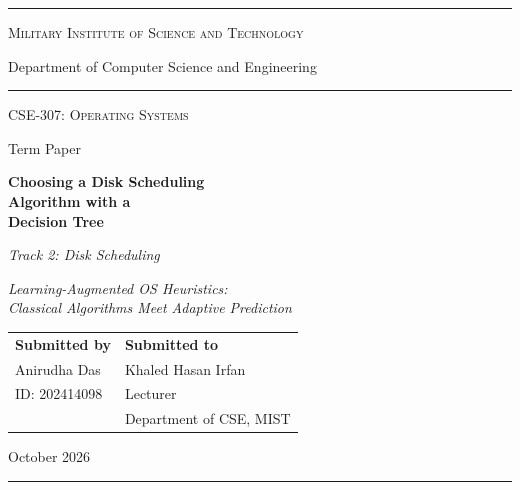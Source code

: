 \documentclass[conference]{IEEEtran}
\begin{document}
\begin{titlepage}
\centering
\vspace*{0.5cm}
{\color{navy}\rule{\textwidth}{2.5pt}}\par
\vspace{0.4cm}
{\Large\textsc{Military Institute of Science and Technology}\par}
\vspace{0.1cm}
{\large Department of Computer Science and Engineering\par}
\vspace{0.4cm}
{\color{navy}\rule{\textwidth}{0.6pt}}\par

\vspace{1.8cm}
{\large\textsc{CSE-307: Operating Systems}\par}
\vspace{0.1cm}
{\large Term Paper\par}

\vspace{1.4cm}
{\fontsize{27}{33}\selectfont\bfseries\color{navy} Choosing a Disk Scheduling\\[2pt] Algorithm with a\\[2pt] Decision Tree\par}

\vspace{0.9cm}
{\large\itshape Track 2: Disk Scheduling\par}
\vspace{0.1cm}
{\normalsize\itshape Learning-Augmented OS Heuristics:\\ Classical Algorithms Meet Adaptive Prediction\par}

\vfill
\begin{tabular}{@{}p{}@{}p{}@{}}
\textbf{\color{navy}Submitted by} & \textbf{\color{navy}Submitted to}\\[4pt]
Anirudha Das & Khaled Hasan Irfan\\
ID: 202414098 & Lecturer\\
 & Department of CSE, MIST\\
\end{tabular}

\vspace{1.6cm}

\vspace{1.2cm}
{\large October 2026\par}
\vspace{0.4cm}
{\color{navy}\rule{\textwidth}{2.5pt}}\par
\end{titlepage}
\end{document}
